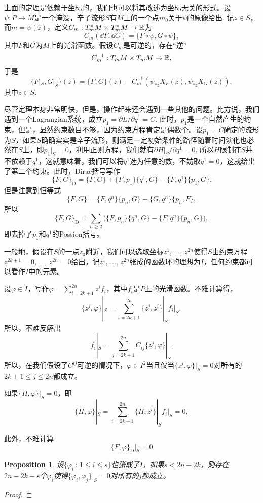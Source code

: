 \documentclass[11pt]{article}
\theoremstyle{definition}
\theoremstyle{plain}
\newtheorem{pro}[para]{Proposition}
\begin{document}
上面的定理是依赖于坐标的，我们也可以将其改述为坐标无关的形式。设$\psi:P\to M$是一个淹没，辛子流形$S$有$M$上的一个点$m_0$关于$\psi$的原像给出. 记$z\in S$，而$m=\psi(z)$，定义$C_m:T_m^*M\times T_m^*M\to \mathbb{R}$为
\[
	C_m(\dd F,\dd G)=\{F\circ \psi,G\circ \psi\},
\]
其中$F$和$G$为$M$上的光滑函数。假设$C_m$是可逆的，存在“逆”
\[
	C_m^{-1}:T_m M\times T_m M\to \mathbb{R},
\]
于是
\[
	\{F|_S,G|_S\}(z)=\{F,G\}(z)-C_m^{-1}(\psi_{*z}X_F(z),\psi_{*z}X_G(z)),
\]
其中$z\in S$.

尽管定理本身非常明快，但是，操作起来还会遇到一些其他的问题。比方说，我们遇到一个Lagrangian系统，成立$p_1=\partial L/\partial \dot q^1=C$. 此时，$p_1$是一个自然产生的约束，但是，显然约束数目不够，因为约束方程肯定是偶数个。设$p_1=C$确定的流形为$S$，如果$S$确确实实是辛子流形，则满足一定初始条件的路径随着时间演化也必然在$S$上，即$\dot p_1|_S=0$，利用正则方程，我们就有$\partial H|_S/\partial q^1=0$. 所以$H$限制在$S$并不依赖于$q^1$，这就意味着，我们可以将$q^1$选为任意的数，不妨取$q^1=0$，这就给出了第二个约束。此时，Dirac括号写作
\[
	\{F,G\}_{\mathrm{D}}=\{F,G\}+\{F,p_1\}\{q^1,G\}-\{F,q^1\}\{p_1,G\}.
\]
但是注意到恒等式
\[
	\{F,G\}=\{F,q^n\}\{p_n,G\}-\{G,q^n\}\{p_n,F\},
\]
所以
\[
	\{F,G\}_{\mathrm{D}}=\sum_{n\geq 2}\bigl(\{F,p_n\}\{q^n,G\}-\{F,q^n\}\{p_n,G\}\bigr),
\]
即去掉了$p_1$和$q^1$的Possion括号。

一般地，假设在$S$的一点$z_0$附近，我们可以选取坐标$z^1$, $\dots$, $z^{2n}$使得$S$由约束方程$z^{2k+1}=0$, $\dots$, $z^{2n}=0$给出，记$z^1$, $\dots$, $z^{2n}$张成的函数环的理想为$I$，任何约束都可以看作$I$中的元素。

设$\varphi\in I$，写作$\varphi=\sum_{i=2k+1}^{2n}z^if_i$，其中$f_i$是$P$上的光滑函数。不难计算得，
\[
	\{z^j,\varphi\}|_S=\sum_{i=2k+1}^{2n}\{z^j,z^i\}|_Sf_i|_S,
\]
所以，不难反解出
\[
	f_i|_S=\sum_{j=2k+1}^{2n}C_{ij}\{z^j,\varphi\}|_S.
\]
所以，在我们假设了$C^{ij}$可逆的情况下，$\varphi\in I^2$当且仅当$\{z^j,\varphi\}|_S=0$对所有的$2k+1\leq j\leq 2n$都成立。

如果$\{H,\varphi\}|_S=0$，即 
\[
	\{H,\varphi\}|_S=\sum_{i=2k+1}^{2n}\{H,z^i\}|_Sf_i|_S=0,
\]

此外，不难计算
\[
	\{F,\varphi\}_{\mathrm D}|_S=0
\]

\begin{pro}
	设$\{\varphi_i\,:\,1\leq i\leq s\}$也张成了$I$，如果$s<2n-2k$，则存在$2n-2k-s$个$\varphi_i$使得$\{\varphi_i,\varphi_j\}|_S=0$对所有的$j$都成立。
\end{pro}

\begin{proof}
	
\end{proof}
\end{document}
